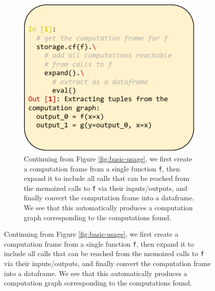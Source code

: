 \documentclass{article} %
\begin{document}
\begin{figure}[htbp]
    \centering
    \begin{minipage}[b]{0.48\textwidth}
        \begin{subfigure}[b]{\textwidth}
            \centering
            \includegraphics[width=\textwidth]{img/fig4.pdf}
            \caption{Continuing from Figure \ref{fig:basic-usage}, we first
            create a computation frame from a single function \texttt{f}, then
            expand it to include all calls that can be reached from the memoized
            calls to \texttt{f} via their inputs/outputs, and finally convert
            the computation frame into a dataframe. We see that this
            automatically produces a computation graph corresponding to the
            computations found.}
            \label{fig:figure1}
        \end{subfigure}
        
        \vspace{1em}
        

\end{minipage}
\end{figure}
\end{document}
